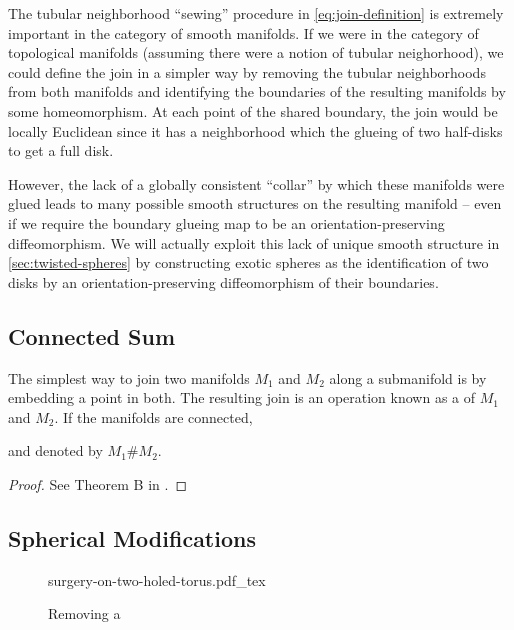 \begin{remark}
	The tubular neighborhood ``sewing'' procedure in \cref{eq:join-definition} is extremely important in the category of smooth manifolds. If we were in the category of topological manifolds (assuming there were a notion of tubular neighorhood), we could define the join in a simpler way by removing the tubular neighborhoods from both manifolds and identifying the boundaries of the resulting manifolds by some homeomorphism. At each point of the shared boundary, the join would be locally Euclidean since it has a neighborhood which the glueing of two half-disks to get a full disk.

	However, the lack of a globally consistent ``collar'' by which these manifolds were glued leads to many possible smooth structures on the resulting manifold -- even if we require the boundary glueing map to be an orientation-preserving diffeomorphism. We will actually exploit this lack of unique smooth structure in \cref{sec:twisted-spheres} by constructing exotic spheres as the identification of two disks by an orientation-preserving diffeomorphism of their boundaries.
\end{remark}

\subsection{Connected Sum}

The simplest way to join two manifolds $M_1$ and $M_2$ along a submanifold is by embedding a point in both. The resulting join is an operation known as a  of $M_1$ and $M_2$. If the manifolds are connected,

and denoted by $M_1\# M_2$.

\begin{theorem}
\end{theorem}
\begin{proof}
	See Theorem B in \cite{palais1960diffeomorphism}.
\end{proof}

\subsection{Spherical Modifications}

\begin{figure}[ht]
	{surgery-on-two-holed-torus.pdf_tex}
	\caption{Removing a }
\end{figure}

